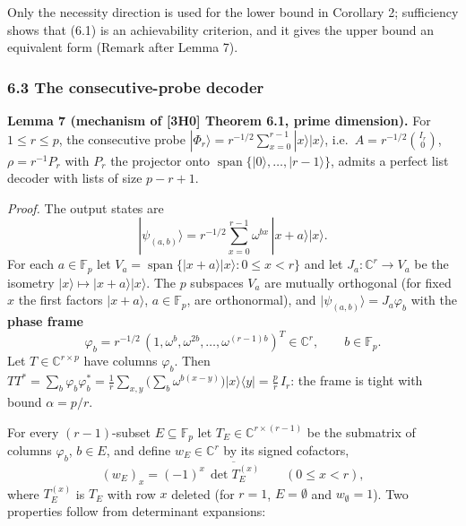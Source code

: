 \documentclass[
  11pt,
  a4paper,
]{article}
\begin{document}
Only the necessity direction is used for the lower bound in Corollary 2;
sufficiency shows that (6.1) is an achievability criterion, and it gives
the upper bound an equivalent form (Remark after Lemma 7).

\subsubsection{6.3 The consecutive-probe
decoder}\label{the-consecutive-probe-decoder}

\textbf{Lemma 7 (mechanism of {[}3H0{]} Theorem 6.1, prime dimension).}
For \(1\le r\le p\), the consecutive probe
\(|\Phi_r\rangle=r^{-1/2}\sum_{x=0}^{r-1}|x\rangle|x\rangle\),
i.e.~\(A=r^{-1/2}\binom{I_r}{0}\), \(\rho=r^{-1}P_r\) with \(P_r\) the
projector onto \(\operatorname{span}\{|0\rangle,\allowbreak{}\dots,\allowbreak{}|r-1\rangle\}\),
admits a perfect list decoder with lists of size \(p-r+1\).

\emph{Proof.} The output states are
\[|\psi_{(a,b)}\rangle=r^{-1/2}\sum_{x=0}^{r-1}\omega^{bx}\,|x+a\rangle|x\rangle .\]
For each \(a\in\mathbb F_p\) let
\(V_a=\operatorname{span}\{|x+a\rangle|x\rangle:0\le x<r\}\) and let
\(J_a:\mathbb C^r\to V_a\) be the isometry
\(|x\rangle\mapsto|x+a\rangle|x\rangle\). The \(p\) subspaces \(V_a\)
are mutually orthogonal (for fixed \(x\) the first factors
\(|x+a\rangle\), \(a\in\mathbb F_p\), are orthonormal), and
\(|\psi_{(a,\allowbreak{}b)}\rangle=J_a\varphi_b\) with the \textbf{phase frame}
\[\varphi_b=r^{-1/2}\,(1,\omega^{b},\omega^{2b},\dots,\omega^{(r-1)b})^{T}\in\mathbb C^r,\qquad b\in\mathbb F_p .\]
Let \(T\in\mathbb C^{r\times p}\) have columns \(\varphi_b\). Then
\(TT^*=\sum_b\varphi_b\varphi_b^*=\frac1r\sum_{x,\allowbreak{}y}\big(\sum_b\omega^{b(x-y)}\big)|x\rangle\langle y|=\frac pr\,\allowbreak{}I_r\):
the frame is tight with bound \(\alpha=p/r\).

For every \((r-1)\)-subset \(E\subseteq\mathbb F_p\) let
\(T_E\in\mathbb C^{r\times(r-1)}\) be the submatrix of columns
\(\varphi_b\), \(b\in E\), and define \(w_E\in\mathbb C^r\) by its
signed cofactors,
\[(w_E)_x=(-1)^x\,\overline{\det T_E^{(x)}}\qquad(0\le x<r),\] where
\(T_E^{(x)}\) is \(T_E\) with row \(x\) deleted (for \(r=1\),
\(E=\emptyset\) and \(w_\emptyset=1\)). Two properties follow from
determinant expansions:
\end{document}
